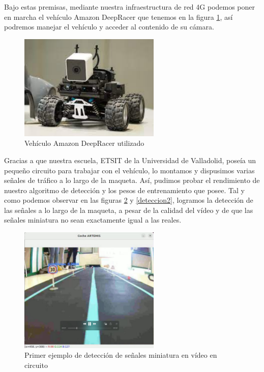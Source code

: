 Bajo estas premisas, mediante nuestra infraestructura de red 4G podemos poner en marcha el vehículo Amazon DeepRacer que tenemos en la figura \ref{deepracer}, así podremos manejar el vehículo y acceder al contenido de su cámara.\\

\begin{figure}[H]
    \centering
 	\includegraphics[width=0.6\textwidth]{Imagenes/IA/deepracer.pdf}
    \caption{Vehículo Amazon DeepRacer utilizado}
    \label{deepracer}
\end{figure}

Gracias a que nuestra escuela, ETSIT de la Universidad de Valladolid, poseía un pequeño circuito para trabajar con el vehículo, lo montamos y dispusimos varias señales de tráfico a lo largo de la maqueta. Así, pudimos probar el rendimiento de nuestro algoritmo de detección y los pesos de entrenamiento que posee. Tal y como podemos observar en las figuras \ref{deteccion1} y \ref{deteccion2}, logramos la detección de las señales a lo largo de la maqueta, a pesar de la calidad del vídeo y de que las señales miniatura no sean exactamente igual a las reales. \\

\begin{figure}[H]
    \centering
 	\includegraphics[width=0.6\textwidth]{Imagenes/IA/deteccion1.pdf}
    \caption{Primer ejemplo de detección de señales miniatura en vídeo en circuito}
    \label{deteccion1}
\end{figure}

